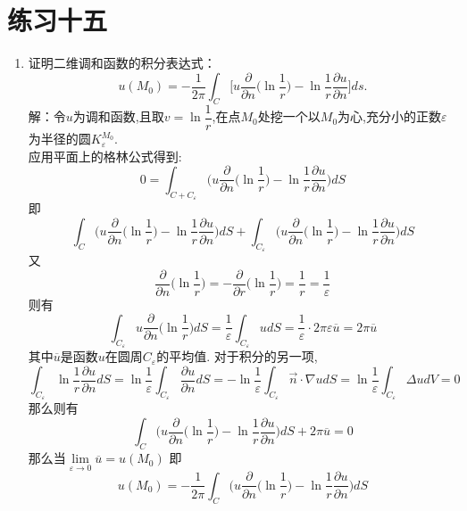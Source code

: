 \documentclass[11pt]{article}
\begin{document}
\section*{练习十五}
    \begin{enumerate}
    \item 证明二维调和函数的积分表达式：
       \[
           u(M_0)=-\dfrac{1}{2\pi}\displaystyle\int_{C}\big[u\dfrac{\partial}{\partial n}\big(\ln\dfrac{1}{r}\big)-\ln\dfrac{1}{r}\dfrac{\partial u}{\partial n}\big]ds.
       \]
        解：令$u$为调和函数,且取$v=\ln\dfrac{1}{r}$,在点$M_0$处挖一个以$M_0$为心,充分小的正数$\varepsilon$为半径的圆$K_{\varepsilon}^{M_0}$.\\
        应用平面上的格林公式得到:
        \[0=\displaystyle\int_{C+C_{\varepsilon}}\big(u\dfrac{\partial}{\partial n}\big(\ln\dfrac{1}{r}\big)-\ln\dfrac{1}{r}\dfrac{\partial u}{\partial n}\big)dS\]
        即\[\displaystyle\int_{C}\big(u\dfrac{\partial}{\partial n}\big(\ln\dfrac{1}{r}\big)-\ln\dfrac{1}{r}\dfrac{\partial u}{\partial n}\big)dS+\displaystyle\int_{C_{\varepsilon}}\big(u\dfrac{\partial}{\partial n}\big(\ln\dfrac{1}{r}\big)-\ln\dfrac{1}{r}\dfrac{\partial u}{\partial n}\big)dS\]
        又\[\dfrac{\partial}{\partial n}\big(\ln\dfrac{1}{r}\big) = -\dfrac{\partial}{\partial r}\big(\ln\dfrac{1}{r}\big) = \dfrac{1}{r}=\dfrac{1}{\varepsilon}\]
        则有\[\displaystyle\int_{C_\varepsilon}u\dfrac{\partial}{\partial n}\big(\ln\dfrac{1}{r}\big)dS=\dfrac{1}{\varepsilon}\displaystyle\int_{C_\varepsilon}udS=\dfrac{1}{\varepsilon}\cdot 2\pi\varepsilon \overline{u}=2\pi\overline{u}\]
        其中$\overline{u}$是函数$u$在圆周$C_\varepsilon$的平均值.
        对于积分的另一项,\[\displaystyle\int_{C_\varepsilon}\ln\dfrac{1}{r}\dfrac{\partial u}{\partial n}dS=\ln\dfrac{1}{\varepsilon}\displaystyle\int_{C_\varepsilon}\dfrac{\partial u}{\partial n}dS=-\ln\dfrac{1}{\varepsilon}\displaystyle\int_{C_\varepsilon}\overrightarrow{n}\cdot \nabla udS=\ln\dfrac{1}{\varepsilon}\displaystyle\int_{C_\varepsilon}\Delta udV=0\]
        那么则有\[\displaystyle\int_{C}\big(u\dfrac{\partial}{\partial n}\big(\ln\dfrac{1}{r}\big)-\ln\dfrac{1}{r}\dfrac{\partial u}{\partial n}\big)dS+2\pi\overline{u}=0\]
        那么当$\lim\limits_{\varepsilon\rightarrow 0}\overline{u}=u(M_0)$
        即\[u(M_0)=-\dfrac{1}{2\pi}\displaystyle\int_{C}\big(u\dfrac{\partial}{\partial n}\big(\ln\dfrac{1}{r}\big)-\ln\dfrac{1}{r}\dfrac{\partial u}{\partial n}\big)dS\]
\end{enumerate}
\end{document}
